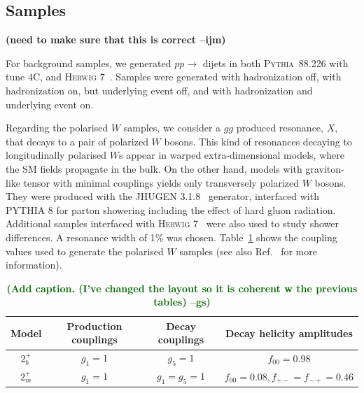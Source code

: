 \documentclass[11pt,letterpaper]{article}
\newcommand{\pythia}{\textsc{Pythia~8}\xspace}
\newcommand{\ijm}[1]{\textbf{\textcolor{llblue}{(#1 --ijm)}}}
\newcommand{\gs}[1]{\textbf{\textcolor{darkgreen}{(#1 --gs)}}}
\begin{document}
\subsection{Samples}\label{sec:samples_sub}

\ijm{need to make sure that this is correct}

For background samples, we generated $pp\to$ dijets in both \pythia{8.226} \cite{Sjostrand:2006za,Sjostrand:2007gs} with tune $4$C,   and \textsc{Herwig} 7~\cite{Bahr:2008pv,Bellm:2015jjp}. Samples were generated with hadronization off, with hadronization on, but underlying event off, and with hadronization and underlying event on.





Regarding the polarised $W$ samples, we consider a $gg$ produced resonance, $X$, that decays to a pair of polarized $W$ bosons. This kind of resonances decaying to longitudinally polarised $W$s appear in warped extra-dimensional models, where the SM fields propagate in the bulk. On the other hand, models with graviton-like tensor with minimal couplings yields only transversely polarized $W$ bosons. They were produced with the \textsc{JHUGEN} 3.1.8~\cite{Gao:2010qx,Bolognesi:2012mm} generator, interfaced with \textsc{PYTHIA} 8 \cite{Sjostrand:2007gs} for parton showering including the effect of hard gluon radiation. Additional samples interfaced with \textsc{Herwig} 7~\cite{Bahr:2008pv,Bellm:2015jjp} were also used to study shower differences. A resonance width of 1\% was chosen. Table~\ref{table:polarisedSamples} shows the coupling values used to generate the polarised $W$ samples (see also Ref.~\cite{Gao:2010qx} for more information). 

\begin{table}[ht]
\centering
\begin{tabular}{|c|c|c|c|}
\hline
Model	&Production couplings	&Decay couplings	&Decay helicity amplitudes 	\\
\hline
$2_b^+$	& $g_1=1$		& $g_5=1$		& $f_{00}=0.98$			\\
$2_m^+$	& $g_1=1$		& $g_1=g_5=1$		& $f_{00}=0.08,f_{+-}=f_{-+}=0.46$\\	
\hline
\end{tabular}
\caption{\gs{Add caption. (I've changed the layout so it is coherent w
  the previous tables)}}
\label{table:polarisedSamples}
\end{table}
\end{document}
